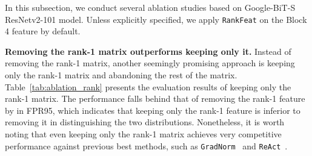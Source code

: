In this subsection, we conduct several ablation studies based on Google-BiT-S ResNetv2-101 model. Unless explicitly specified, we apply \texttt{RankFeat} on the Block 4 feature by default. 

\begin{table}[htbp]
    \caption{Ablation studies on keeping only the rank-1 matrix and removing the rank-n matrix. }
    \centering
    \label{tab:ablation_rank}
\end{table}

\noindent \textbf{Removing the rank-1 matrix outperforms keeping only it.} Instead of removing the rank-1 matrix, another seemingly promising approach is keeping only the rank-1 matrix and abandoning the rest of the matrix. Table~\ref{tab:ablation_rank} presents the evaluation results of keeping only the rank-1 matrix. The performance falls behind that of removing the rank-1 feature by  in FPR95, which indicates that keeping only the rank-1 feature is inferior to removing it in distinguishing the two distributions. Nonetheless, it is worth noting that even keeping only the rank-1 matrix achieves very competitive performance against previous best methods, such as \texttt{GradNorm}~\cite{huang2021importance} and \texttt{ReAct}~\cite{sun2021react}.

